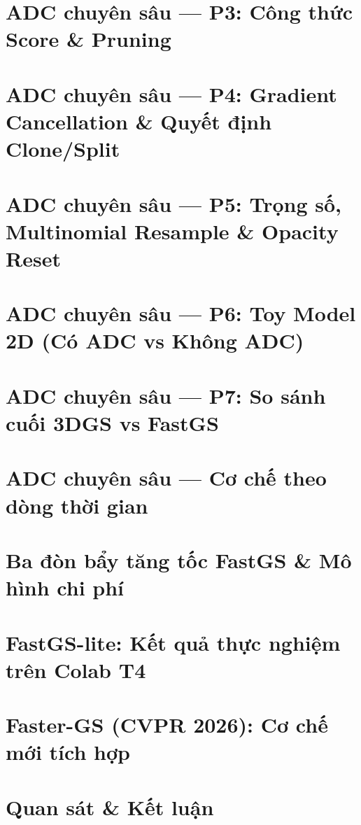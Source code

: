 \documentclass[aspectratio=169,9pt]{beamer}
\begin{document}
\section{ADC chuyên sâu — P3: Công thức Score \& Pruning}



\section{ADC chuyên sâu — P4: Gradient Cancellation \& Quyết định Clone/Split}



\section{ADC chuyên sâu — P5: Trọng số, Multinomial Resample \& Opacity Reset}



\section{ADC chuyên sâu — P6: Toy Model 2D (Có ADC vs Không ADC)}


\section{ADC chuyên sâu — P7: So sánh cuối 3DGS vs FastGS}


\section{ADC chuyên sâu — Cơ chế theo dòng thời gian}



\section{Ba đòn bẩy tăng tốc FastGS \& Mô hình chi phí}


\section{FastGS-lite: Kết quả thực nghiệm trên Colab T4}


\section{Faster-GS (CVPR 2026): Cơ chế mới tích hợp}









\section{Quan sát \& Kết luận}

\end{document}
